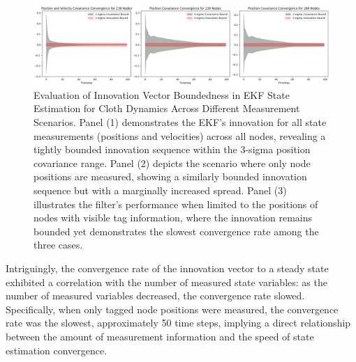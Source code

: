 \documentclass[subscriptcorrection,upint,varvw,barcolor=Goldenrod3,mathalfa=cal=euler,balance,hyphenate,french,pdf-a, nofoot]{asmejour} %
\begin{document}



\begin{figure}[t]
\centering
\includegraphics[width=\textwidth]{Covariance Bound.png} %
\caption{Evaluation of Innovation Vector Boundedness in EKF State Estimation for Cloth Dynamics Across Different Measurement Scenarios. Panel (1) demonstrates the EKF's innovation for all state measurements (positions and velocities) across all nodes, revealing a tightly bounded innovation sequence within the 3-sigma position covariance range. Panel (2) depicts the scenario where only node positions are measured, showing a similarly bounded innovation sequence but with a marginally increased spread. Panel (3) illustrates the filter's performance when limited to the positions of nodes with visible tag information, where the innovation remains bounded yet demonstrates the slowest convergence rate among the three cases.}
\label{fig:yourlabel}
\end{figure}

Intriguingly, the convergence rate of the innovation vector to a steady state exhibited a correlation with the number of measured state variables: as the number of measured variables decreased, the convergence rate slowed. Specifically, when only tagged node positions were measured, the convergence rate was the slowest, approximately 50 time steps, implying a direct relationship between the amount of measurement information and the speed of state estimation convergence.
\end{document}
